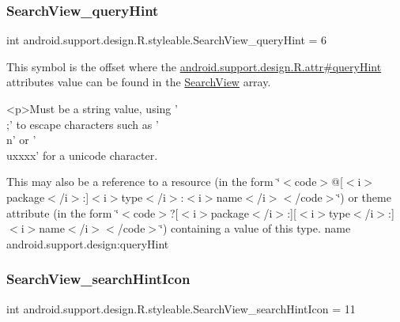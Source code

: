 \subsubsection{\texorpdfstring{Search\+View\+\_\+query\+Hint}{SearchView\_queryHint}}
{\footnotesize\ttfamily int android.\+support.\+design.\+R.\+styleable.\+Search\+View\+\_\+query\+Hint = 6\hspace{0.3cm}{\ttfamily [static]}}

This symbol is the offset where the \hyperlink{classandroid_1_1support_1_1design_1_1R_1_1attr_a7c779885d4f7e8381f2dbfbd244c5470}{android.\+support.\+design.\+R.\+attr\#query\+Hint} attribute\textquotesingle{}s value can be found in the \hyperlink{classandroid_1_1support_1_1design_1_1R_1_1styleable_a8f7e72dc1bf854e14c1be7dbc1cb7392}{Search\+View} array.

\begin{DoxyVerb}      <p>Must be a string value, using '\\;' to escape characters such as '\\n' or '\\uxxxx' for a unicode character.
\end{DoxyVerb}
 

This may also be a reference to a resource (in the form \char`\"{}$<$code$>$@\mbox{[}$<$i$>$package$<$/i$>$\+:\mbox{]}$<$i$>$type$<$/i$>$\+:$<$i$>$name$<$/i$>$$<$/code$>$\char`\"{}) or theme attribute (in the form \char`\"{}$<$code$>$?\mbox{[}$<$i$>$package$<$/i$>$\+:\mbox{]}\mbox{[}$<$i$>$type$<$/i$>$\+:\mbox{]}$<$i$>$name$<$/i$>$$<$/code$>$\char`\"{}) containing a value of this type.  name android.\+support.\+design\+:query\+Hint \mbox{\label{classandroid_1_1support_1_1design_1_1R_1_1styleable_a9c896f5dd793d57c75958116ba69b26c}} 
\subsubsection{\texorpdfstring{Search\+View\+\_\+search\+Hint\+Icon}{SearchView\_searchHintIcon}}
{\footnotesize\ttfamily int android.\+support.\+design.\+R.\+styleable.\+Search\+View\+\_\+search\+Hint\+Icon = 11\hspace{0.3cm}{\ttfamily [static]}}

